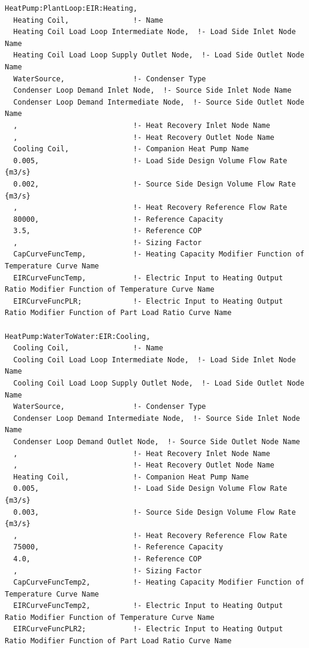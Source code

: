 \begin{lstlisting}
HeatPump:PlantLoop:EIR:Heating,
  Heating Coil,               !- Name
  Heating Coil Load Loop Intermediate Node,  !- Load Side Inlet Node Name
  Heating Coil Load Loop Supply Outlet Node,  !- Load Side Outlet Node Name
  WaterSource,                !- Condenser Type
  Condenser Loop Demand Inlet Node,  !- Source Side Inlet Node Name
  Condenser Loop Demand Intermediate Node,  !- Source Side Outlet Node Name
  ,                           !- Heat Recovery Inlet Node Name
  ,                           !- Heat Recovery Outlet Node Name
  Cooling Coil,               !- Companion Heat Pump Name
  0.005,                      !- Load Side Design Volume Flow Rate {m3/s}
  0.002,                      !- Source Side Design Volume Flow Rate {m3/s}
  ,                           !- Heat Recovery Reference Flow Rate
  80000,                      !- Reference Capacity
  3.5,                        !- Reference COP
  ,                           !- Sizing Factor
  CapCurveFuncTemp,           !- Heating Capacity Modifier Function of Temperature Curve Name
  EIRCurveFuncTemp,           !- Electric Input to Heating Output Ratio Modifier Function of Temperature Curve Name
  EIRCurveFuncPLR;            !- Electric Input to Heating Output Ratio Modifier Function of Part Load Ratio Curve Name

HeatPump:WaterToWater:EIR:Cooling,
  Cooling Coil,               !- Name
  Cooling Coil Load Loop Intermediate Node,  !- Load Side Inlet Node Name
  Cooling Coil Load Loop Supply Outlet Node,  !- Load Side Outlet Node Name
  WaterSource,                !- Condenser Type
  Condenser Loop Demand Intermediate Node,  !- Source Side Inlet Node Name
  Condenser Loop Demand Outlet Node,  !- Source Side Outlet Node Name
  ,                           !- Heat Recovery Inlet Node Name
  ,                           !- Heat Recovery Outlet Node Name
  Heating Coil,               !- Companion Heat Pump Name
  0.005,                      !- Load Side Design Volume Flow Rate {m3/s}
  0.003,                      !- Source Side Design Volume Flow Rate {m3/s}
  ,                           !- Heat Recovery Reference Flow Rate
  75000,                      !- Reference Capacity
  4.0,                        !- Reference COP
  ,                           !- Sizing Factor
  CapCurveFuncTemp2,          !- Heating Capacity Modifier Function of Temperature Curve Name
  EIRCurveFuncTemp2,          !- Electric Input to Heating Output Ratio Modifier Function of Temperature Curve Name
  EIRCurveFuncPLR2;           !- Electric Input to Heating Output Ratio Modifier Function of Part Load Ratio Curve Name
\end{lstlisting}

